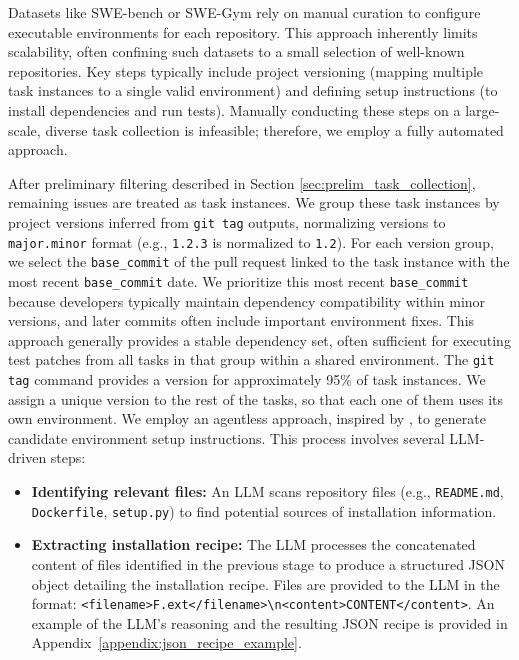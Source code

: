 \documentclass[dandb]{article}
\begin{document}
Datasets like SWE-bench \citep{jimenez2024swebench} or SWE-Gym \citep{pan2024trainingsoftwareengineeringagents} rely on manual curation to configure executable environments for each repository. This approach inherently limits scalability, often confining such datasets to a small selection of well-known repositories. Key steps typically include project versioning (mapping multiple task instances to a single valid environment) and defining setup instructions (to install dependencies and run tests). Manually conducting these steps on a large-scale, diverse task collection is infeasible; therefore, we employ a fully automated approach.

After preliminary filtering described in Section \ref{sec:prelim_task_collection}, remaining issues are treated as task instances. We group these task instances by project versions inferred from \verb|git tag| outputs, normalizing versions to \verb|major.minor| format (e.g., \verb|1.2.3| is normalized to \verb|1.2|). For each version group, we select the \verb|base_commit| of the pull request linked to the task instance with the most recent \verb|base_commit| date. We prioritize this most recent \verb|base_commit| because developers typically maintain dependency compatibility within minor versions, and later commits often include important environment fixes. This approach generally provides a stable dependency set, often sufficient for executing test patches from all tasks in that group within a shared environment. The \verb|git tag| command provides a version for approximately 95\% of task instances. We assign a unique version to the rest of the tasks, so that each one of them uses its own environment.
We employ an agentless approach, inspired by \citep{xia2024agentlessdemystifyingllmbasedsoftware}, to generate candidate environment setup instructions. This process involves several LLM-driven steps:

\begin{itemize}
    \item \textbf{Identifying relevant files:} An LLM scans repository files (e.g., \verb|README.md|, \verb|Dockerfile|, \verb|setup.py|) to find potential sources of installation information.
    \item \textbf{Extracting installation recipe:} The LLM processes the concatenated content of files identified in the previous stage to produce a structured JSON object detailing the installation recipe. Files are provided to the LLM in the format: \verb|<filename>F.ext</filename>\n<content>CONTENT</content>|. An example of the LLM's reasoning and the resulting JSON recipe is provided in Appendix~\ref{appendix:json_recipe_example}.
\end{itemize}
\end{document}
